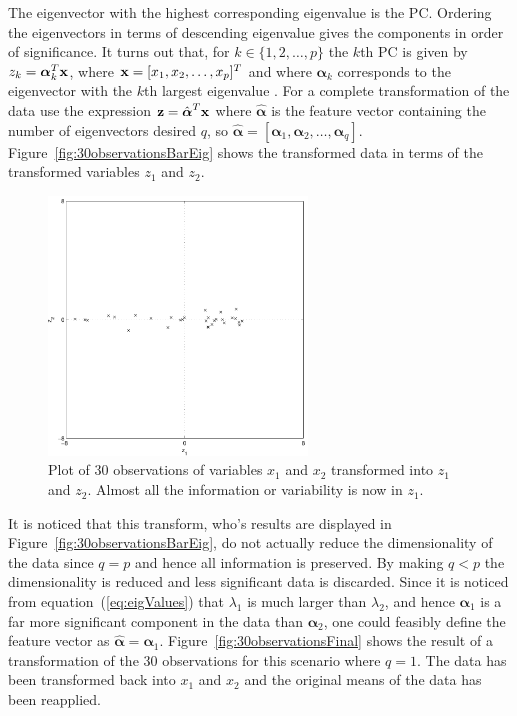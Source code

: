 The eigenvector with the highest corresponding eigenvalue is the PC. Ordering the eigenvectors in terms of descending eigenvalue gives the components in order of significance. It turns out that, for $k \in \{1, 2, \ldots, p\}$ the $k$th PC is given by $z_k = \boldsymbol\alpha_k^T\textrm{\textbf{x}}$, where $\textrm{\textbf{x}} = [x_1,x_2,\ldots, x_p]^T$ and where $\boldsymbol\alpha_k$ corresponds to the eigenvector with the $k$th largest eigenvalue \citep[p. 2-3]{Jolliffe1986}. For a complete transformation of the data use the expression $\textrm{\textbf{z}} = \hat{\boldsymbol\alpha}^T\textrm{\textbf{x}}$ where $\hat{\boldsymbol\alpha}$ is the feature vector containing the number of eigenvectors desired $q$, so $\hat{\boldsymbol\alpha} = [\boldsymbol\alpha_1,\boldsymbol\alpha_2,\ldots,\boldsymbol\alpha_q]$. Figure~\ref{fig:30observationsBarEig} shows the transformed data in terms of the transformed variables $z_1$ and $z_2$.

\begin{figure}[!]
  \begin{center}
    \includegraphics[width=260px]{30observationsBarTrans.pdf}
    \caption{Plot of 30 observations of variables $x_1$ and $x_2$ transformed into $z_1$ and $z_2$. Almost all the information or variability is now in $z_1$.}\label{fig:30observationsBarTrans}
  \end{center}
\end{figure}

It is noticed that this transform, who's results are displayed in Figure~\ref{fig:30observationsBarEig}, do not actually reduce the dimensionality of the data since $q=p$ and hence all information is preserved. By making $q<p$ the dimensionality is reduced and less significant data is discarded. Since it is noticed from equation~(\ref{eq:eigValues}) that $\lambda_1$ is much larger than $\lambda_2$, and hence $\boldsymbol\alpha_1$ is a far more significant component in the data than $\boldsymbol\alpha_2$, one could feasibly define the feature vector as $\hat{\boldsymbol\alpha} = \boldsymbol\alpha_1$. Figure~\ref{fig:30observationsFinal} shows the result of a transformation of the 30 observations for this scenario where $q=1$. The data has been transformed back into $x_1$ and $x_2$ and the original means of the data has been reapplied.

